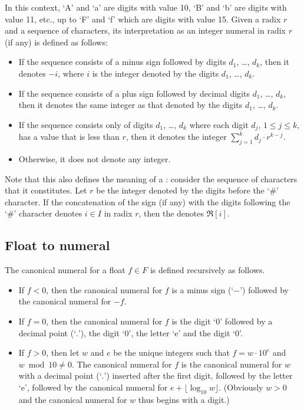 \label{section:radix-numeral-to-integer}
In this context, `A' and `a' are digits
with value 10, `B' and `b' are digits with value 11, etc., up to `F' and `f' which are digits
with value 15.
Given a radix $r$ and a sequence of characters, its interpretation as an
integer numeral in radix $r$ (if any) is defined as follows:
\begin{itemize}
\item If the sequence consists of a minus sign followed by digits $d_1$, \ldots, $d_k$,
then it denotes $-i$, where $i$ is the integer denoted by the digits $d_1$, \ldots, $d_k$.
\item If the sequence consists of a plus sign followed by decimal digits $d_1$, \ldots, $d_k$,
then it denotes the same integer as that denoted by the digits $d_1$, \ldots, $d_k$.
\item If the sequence consists only of digits $d_1$, \ldots, $d_k$ where each digit $d_j$,
$1\leq j\leq k$, has a value that is less than $r$, then it
denotes the integer $\sum_{j=1}^k d_j\cdot r^{k-j}$.  
\item Otherwise, it does not denote any integer.
\end{itemize}
Note that this also defines the meaning of a
:
consider the sequence of characters that it constitutes.
Let $r$ be the integer denoted by the digits before the `\#' character.  If
the concatenation of
the sign (if any) with the digits following the `\#' character denotes
$i\in I$ in radix $r$, then the  denotes $\Re[i]$.

\subsection{Float to numeral}

\label{section:float-to-numeral}
The canonical numeral for a float $f\in F$ is defined recursively as follows.
\begin{itemize}
\item If $f<0$, then the canonical numeral for $f$ is a minus sign (`$-$') followed by the
canonical numeral for $-f$.
\item If $f=0$, then the canonical numeral for $f$ is the digit `0' followed by a decimal
point (`$.$'), the digit `0', the letter `e' and the digit `0'.
\item If $f>0$, then let
$w$ and $e$ be the unique integers such that $f=w\cdot10^e$ and $w \bmod 10\neq 0$.
The canonical numeral for $f$ is the canonical numeral for $w$ with a decimal point
 (`$.$') inserted after the first digit, followed by the letter `e', followed
by the canonical numeral for $e+\lfloor\log_{10}w\rfloor$.
(Obviously $w>0$ and the canonical numeral for $w$ thus begins with a digit.)
\end{itemize}


